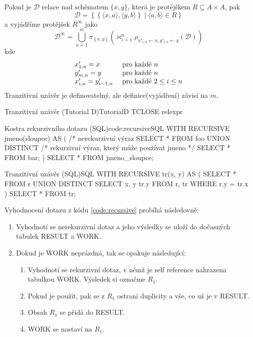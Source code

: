 Pokud je $\mathcal{D}$ relace nad schématem $\lbrace x, y \rbrace$, která je protějškem $R \subseteq A \times A$, pak
$$
\mathcal{D} = \left\{ \left\{ \langle x, a \rangle, \langle y, b \rangle \right\} \; | \; \langle a, b \rangle \in R \right\}
$$
a vyjádříme protějšek $R^{\infty}$ jako
$$
\mathcal{D}^{\infty} = \bigcup_{n = 1}^{m} \pi_{\left\{ x, y \right\}} \left( \Join_{i = 1}^{n} \rho _{x'_{i, n} \leftarrow x, y'_{i, n} \leftarrow y}(\mathcal{D}) \right)
$$
kde
$$
\begin{array}{l l}
x'_{1, n} = x & \text{ pro každé } n \\
y'_{m, n} = y & \text{ pro každé } n \\
x'_{i, n} = y'_{i-1,n} & \text{ pro každé } 2 \leq i \leq n
\end{array}
$$
Tranzitivní uzávěr je definovatelný, ale definice(vyjádření) závisí na $m$.
\begin{upcode}{Tranzitivní uzávěr (Tutorial D)}{}{TutorialD}
TCLOSE relexpr
\end{upcode}
\begin{upcode}{Kostra rekurzivního dotazu (SQL)}{code:recursive}{SQL}
WITH RECURSIVE jmeno(sloupce) AS (
	/* nerekurzivní výraz
	SELECT	*
	FROM	foo
	UNION	DISTINCT
	/* rekurzivní výraz, který může používat jmeno */
	SELECT	*
	FROM 	bar;
)
SELECT	*
FROM	jmeno_sloupce;
\end{upcode}
\begin{upcode}{Tranzitivní uzávěr (SQL)}{}{SQL}
WITH RECURSIVE tr(x, y) AS (
	SELECT	*
	FROM 	r
	UNION	DISTINCT
	SELECT	x, y tr.y FROM r, tr
	WHERE	r.y = tr.x
)
SELECT * FROM tr;
\end{upcode}
Vyhodnocení dotazu z kódu \ref{code:recursive} probíhá následovně:
\begin{enumerate}
\item Vyhodnotí se nerekurzivní dotaz a jeho výsledky se uloží do dočasných tabulek RESULT a WORK.
\item Dokud je WORK neprázdná, tak se opakuje následující:
\begin{enumerate}
\item Vyhodnotí se rekurzivní dotaz, v němž je self reference nahrazena tabulkou WORK. Výsledek si označme $R_{1}$.
\item Pokud je použit, pak se z $R_{1}$ ostraní duplicity a vše, co už je v RESULT.
\item Obsah $R_{1}$ se přidá do RESULT.
\item WORK se nastaví na $R_{1}$.
\end{enumerate}
\end{enumerate}